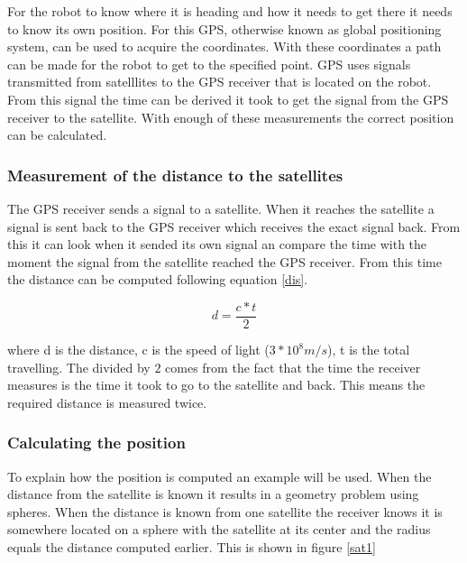 \documentclass{article}
\begin{document}
For the robot to know where it is heading and how it needs to get there it needs to know its own position. For this GPS, otherwise known as global positioning system, can be used to acquire the coordinates. With these coordinates a path can be made for the robot to get to the specified point. GPS uses signals transmitted from satelllites to the GPS receiver that is located on the robot. From this signal the time can be derived it took to get the signal from the GPS receiver to the satellite. With enough of these measurements the correct position can be calculated.

\subsubsection{Measurement of the distance to the satellites}

The GPS receiver sends a signal to a satellite. When it reaches the satellite a signal is sent back to the GPS receiver which receives the exact signal back. From this it can look when it sended its own signal an compare the time with the moment the signal from the satellite reached the GPS receiver. From this time the distance can be computed following equation \ref{dis}.

\begin{equation}
d = \frac{c*t}{2}
\label{dis}
\end{equation}

where d is the distance, c is the speed of light ($3*10^8 m/s$), t is the total travelling. The divided by $2$ comes from the fact that the time the receiver measures is the time it took to go to the satellite and back. This means the required distance is measured twice.

\subsubsection{Calculating the position}

To explain how the position is computed an example will be used. When the distance from the satellite is known it results in a geometry problem using spheres. When the distance is known from one satellite the receiver knows it is somewhere located on a sphere with the satellite at its center and the radius equals the distance computed earlier. This is shown in figure \ref{sat1}
\end{document}
